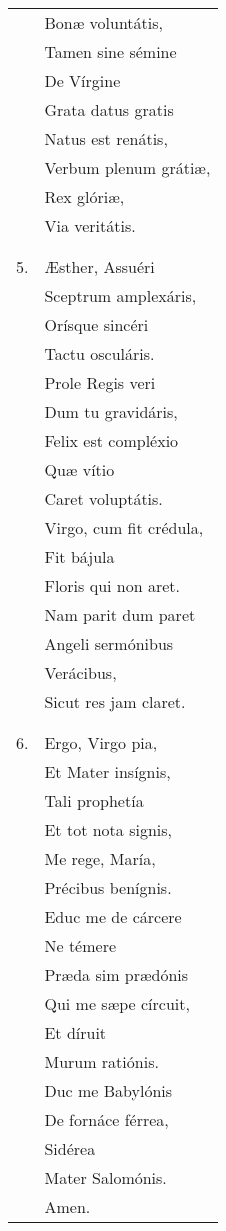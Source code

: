 \begin{longtable}{ll}
&Bonæ voluntátis,\\
&Tamen sine sémine\\
&De Vírgine\\
&Grata datus gratis\\
&Natus est renátis,\\
&Verbum plenum grátiæ,\\
&Rex glóriæ,\\
&Via veritátis.\\
\\\\
5. &Æsther, Assuéri\\
&Sceptrum amplexáris,\\
&Orísque sincéri\\
&Tactu osculáris.\\
&Prole Regis veri\\
&Dum tu gravidáris,\\
&Felix est compléxio\\
&Quæ vítio\\
&Caret voluptátis.\\
&Virgo, cum fit crédula,\\
&Fit bájula\\
&Floris qui non aret.\\
&Nam parit dum paret\\
&Angeli sermónibus\\
&Verácibus,\\
&Sicut res jam claret.\\
\\\\
6. &Ergo, Virgo pia,\\
&Et Mater insígnis,\\
&Tali prophetía\\
&Et tot nota signis,\\
&Me rege, María,\\
&Précibus benígnis.\\
&Educ me de cárcere\\
&Ne témere\\
&Præda sim prædónis\\
&Qui me sæpe círcuit,\\
&Et díruit\\
&Murum ratiónis.\\
&Duc me Babylónis\\
&De fornáce férrea,\\
&Sidérea\\
&Mater Salomónis.\\
&Amen.
\end{longtable}
